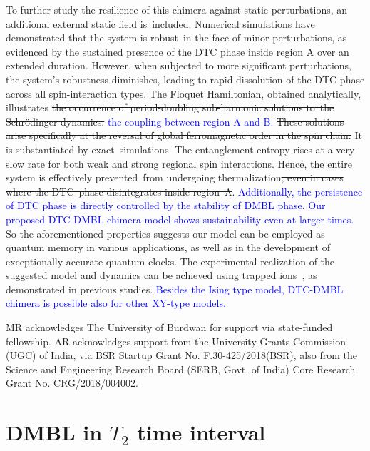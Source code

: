 \documentclass[
nofootinbib,
reprint,
superscriptaddress,
amsmath,amssymb,showkeys,
aps,
prb,
]{revtex4-2}
\newcommand{\blue}[1]{\textcolor{blue}{#1}}
\begin{document}
	To further study the resilience of this chimera against static perturbations, an additional external static field is included. Numerical simulations have demonstrated that the system is robust in the face of minor perturbations, as evidenced by the sustained presence of the DTC phase inside region A over an extended duration. However, when subjected to more significant perturbations, the system's robustness diminishes, leading to rapid dissolution of the DTC phase across all spin-interaction types. The Floquet Hamiltonian, obtained analytically, illustrates \sout{the occurrence of period-doubling sub-harmonic solutions to the Schr\"odinger dynamics.} \blue{the coupling between region A and B.} \sout{These solutions arise specifically at the reversal of global ferromagnetic order in the spin chain.} It is substantiated by exact simulations. The entanglement entropy rises at a very slow rate for both weak and strong regional spin interactions. Hence, the entire system is effectively prevented from undergoing thermalization\sout{, even in cases where the DTC phase disintegrates inside region A}. \blue{Additionally, the persistence of DTC phase is directly controlled by the stability of DMBL phase. Our proposed DTC-DMBL chimera model shows sustainability even at larger times.} So the aforementioned properties suggests our model can be employed as quantum memory in various applications, as well as in the development of exceptionally accurate quantum clocks. The experimental realization of the suggested model and dynamics can be achieved using trapped ions~\cite{sakurai_phys_nodate, Friedenauer2008}, as demonstrated in previous studies. \blue{Besides the Ising type model, DTC-DMBL chimera is possible also for other XY-type models.}
	
	\begin{acknowledgments}
		MR acknowledges The University of Burdwan for support via state-funded fellowship. AR acknowledges support from the University Grants Commission (UGC) of India, via BSR Startup Grant No. F.30-425/2018(BSR), also from the Science and Engineering Research Board (SERB, Govt. of India) Core Research Grant No. CRG/2018/004002.
	\end{acknowledgments}
	
	
	
	
	
	\newpage
	\clearpage
	\appendix
	\onecolumngrid
	\section{\label{sec:AppendixA} DMBL in $T_2$ time interval}
	
\end{document}
